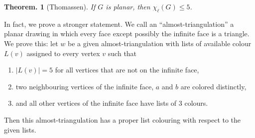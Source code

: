 \documentclass[11pt, a4paper]{memoir}
\theoremstyle{change}
\newtheorem{theorem}{Theorem.}[section]
\theoremstyle{plain}
\theoremstyle{nonumberplain}
\numberwithin{equation}{section}
\begin{document}
\begin{theorem}[Thomassen]
    If $G$ is planar, then $\chi_\ell(G)\leq 5$.
\end{theorem}
In fact, we prove a stronger statement.
We call an ``almost-triangulation'' a planar drawing in which every face except possibly the infinite face is a triangle.
We prove this: let $w$ be a given almost-triangulation with lists of available colour $L(v)$ assigned to every vertex $v$ such that
\begin{enumerate}[nl]
    \item $|L(v)|=5$ for all vertices that are not on the infinite face,
    \item two neighbouring vertices of the infinite face, $a$ and $b$ are colored distinctly,
    \item and all other vertices of the infinite face have lists of 3 colours.
\end{enumerate}
Then this almost-triangulation has a proper list colouring with respect to the given lists.
\end{document}

